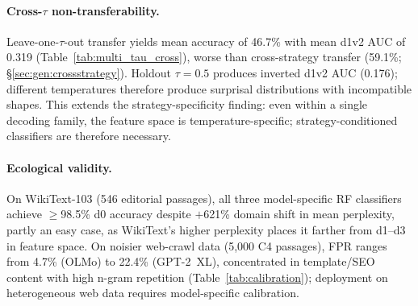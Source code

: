 \paragraph{Cross-$\tau$ non-transferability.}
Leave-one-$\tau$-out transfer yields mean accuracy of 46.7\% with mean d1v2 AUC of 0.319 (Table~\ref{tab:multi_tau_cross}), worse than cross-strategy transfer (59.1\%; \S\ref{sec:gen:crossstrategy}).
Holdout $\tau{=}0.5$ produces inverted d1v2 AUC (0.176); different temperatures therefore produce surprisal distributions with incompatible shapes.
This extends the strategy-specificity finding: even within a single decoding family, the feature space is temperature-specific; strategy-conditioned classifiers are therefore necessary.

\paragraph{Ecological validity.}
On WikiText-103 (546 editorial passages), all three model-specific RF classifiers achieve $\geq$98.5\% d0 accuracy despite $+$621\% domain shift in mean perplexity, partly an easy case, as WikiText's higher perplexity places it farther from d1--d3 in feature space.
On noisier web-crawl data (5{,}000 C4 passages), FPR ranges from 4.7\% (OLMo) to 22.4\% (GPT-2~XL), concentrated in template/SEO content with high n-gram repetition (Table~\ref{tab:calibration}); deployment on heterogeneous web data requires model-specific calibration.

\begin{table}[h]
\centering
\small
\caption{Within-$\tau$ 4-class classification (Pythia-1.4B, 5-fold CV, independent pipeline run). d$i$v$j$: pairwise AUC for depth $i$ vs.\ depth $j$. The $\tau{=}0.9$ accuracy (75.9\%) differs from the main atlas (76.8\%, Table~\ref{tab:main_matrix}) due to separate generation and LoRA training runs.}
\label{tab:multi_tau_within}
\end{table}

